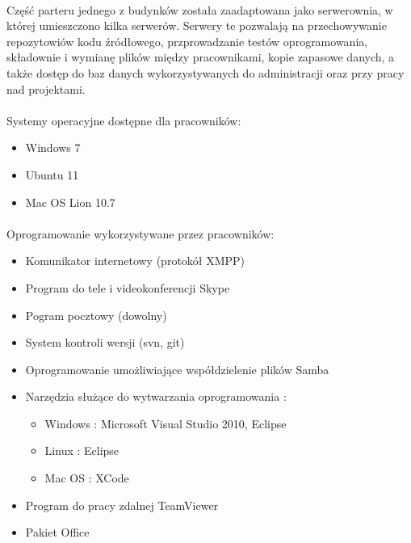 \paragraph{}
Część parteru jednego z budynków została zaadaptowana jako serwerownia, w której umieszczono kilka serwerów. Serwery te pozwalają na przechowywanie repozytowiów kodu źródłowego, przprowadzanie testów oprogramowania, składownie i wymianę plików między pracownikami, kopie zapasowe danych, a także dostęp do baz danych wykorzystywanych do administracji oraz przy pracy nad projektami.

\paragraph{}
Systemy operacyjne dostępne dla pracowników:
\begin{itemize}
  \item Windows 7
  \item Ubuntu 11
  \item Mac OS Lion 10.7
\end{itemize}

\paragraph{}
Oprogramowanie wykorzystywane przez pracowników:
\begin{itemize}
  \item Komunikator internetowy (protokół XMPP)
  \item Program do tele i videokonferencji Skype
  \item Pogram pocztowy (dowolny)
  \item System kontroli wersji (svn, git)
  \item Oprogramowanie umożliwiające współdzielenie plików Samba
  \item Narzędzia służące do wytwarzania oprogramowania :
  \begin{itemize}
	\item Windows : Microsoft Visual Studio 2010, Eclipse
	\item Linux : Eclipse
	\item Mac OS : XCode
  \end{itemize}
  \item Program do pracy zdalnej TeamViewer
 \item Pakiet Office
\end{itemize}






